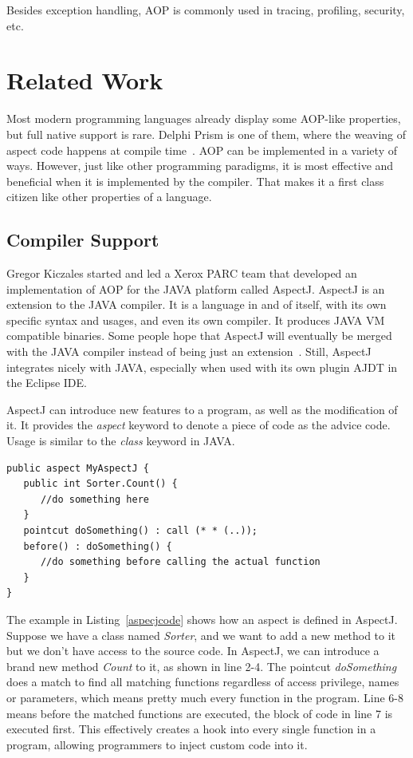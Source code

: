 Besides exception handling, AOP is commonly used in tracing, profiling, security, etc.

\section{Related Work}Most modern programming languages already display some AOP-like properties, but full native support is rare. Delphi Prism is one of them, where the weaving of aspect code happens at compile time~\cite{delphi_prism2010}. AOP can be implemented in a variety of ways. However, just like other programming paradigms, it is most effective and beneficial when it is implemented by the compiler. That makes it a first class citizen like other properties of a language.

\subsection{Compiler Support}

Gregor Kiczales started and led a Xerox PARC team that developed an implementation of AOP for the JAVA platform called AspectJ\cite{aop}. AspectJ is an extension to the JAVA compiler. It is a language in and of itself, with its own specific syntax and usages, and even its own compiler. It produces JAVA VM compatible binaries. Some people hope that AspectJ will eventually be merged with the JAVA compiler instead of being just an extension~\cite{aspectj_faq}. Still, AspectJ integrates nicely with JAVA, especially when used with its own plugin AJDT in the Eclipse IDE.

AspectJ can introduce new features to a program, as well as the modification of it. It provides the {\em aspect} keyword to denote a piece of code as the advice code. Usage is similar to the {\em class} keyword in JAVA.

\begin{lstlisting}[caption={sample AspectJ code}, label=aspecjcode]
public aspect MyAspectJ {
   public int Sorter.Count() {
      //do something here
   }
   pointcut doSomething() : call (* * (..));
   before() : doSomething() {
      //do something before calling the actual function
   }
}
\end{lstlisting}

The example in Listing~\ref{aspecjcode} shows how an aspect is defined in AspectJ. Suppose we have a class named {\em Sorter}, and we want to add a new method to it but we don't have access to the source code. In AspectJ, we can introduce a brand new method {\em Count} to it, as shown in line 2-4. The pointcut {\em doSomething} does a match to find all matching functions regardless of access privilege, names or parameters, which means pretty much every function in the program. Line 6-8 means before the matched functions are executed, the block of code in line 7 is executed first. This effectively creates a hook into every single function in a program, allowing programmers to inject custom code into it.

